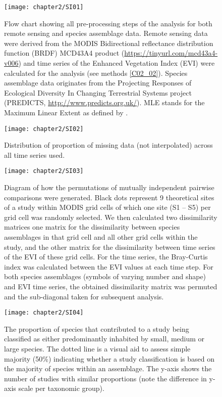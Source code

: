 \begin{figure}[htb]
\centering
\texttt{[image: chapter2/SI01]}
\caption{ Flow chart showing all pre-processing steps of the analysis for both remote sensing and species assemblage data. Remote sensing data were derived from the MODIS Bidirectional reflectance distribution function (BRDF) MCD43A4 product (\href{https://tinyurl.com/mcd43a4-v006}{https://tinyurl.com/mcd43a4-v006}) and time series of the Enhanced Vegetation Index (EVI) were calculated for the analysis (see methods \ref{C02_02}). Species assemblage data originates from the Projecting Responses of Ecological Diversity In Changing Terrestrial Systems project (PREDICTS, \href{http://www.predicts.org.uk/}{http://www.predicts.org.uk/}). MLE stands for the Maximum Linear Extent as defined by \citep{Hudson2016}.}
\label{SI02_01}
\end{figure}

\begin{figure}[htb]
\centering
\texttt{[image: chapter2/SI02]}
\caption{ Distribution of proportion of missing data (not interpolated) across all time series used. }
\label{SI02_02}
\end{figure}

\begin{figure}[htb]
\centering
\texttt{[image: chapter2/SI03]}
\caption{ Diagram of how the permutations of mutually independent pairwise comparisons were generated. Black dots represent 9 theoretical sites of a study within MODIS grid cells of which one site (S1 – S5) per grid cell was randomly selected. We then calculated two dissimilarity matrices one matrix for the dissimilarity between species assemblages in that grid cell and all other grid cells within the study, and the other matrix for the dissimilarity between time series of the EVI of these grid cells.  For the time series, the Bray-Curtis index was calculated between the EVI values at each time step. For both species assemblages (symbols of varying number and shape) and EVI time series, the obtained dissimilarity matrix was permuted and the sub-diagonal taken for subsequent analysis. }
\label{SI02_03}
\end{figure}

\begin{figure}[htb]
\centering
\texttt{[image: chapter2/SI04]}
\caption{ The proportion of species that contributed to a study being classified as either predominantly inhabited by small, medium or large species. The dotted line is a visual aid to assess simple majority (50\%) indicating whether a study classification is based on the majority of species within an assemblage. The y-axis shows the number of studies with similar proportions (note the difference in y-axis scale per taxonomic group). }
\label{SI02_04}
\end{figure}

